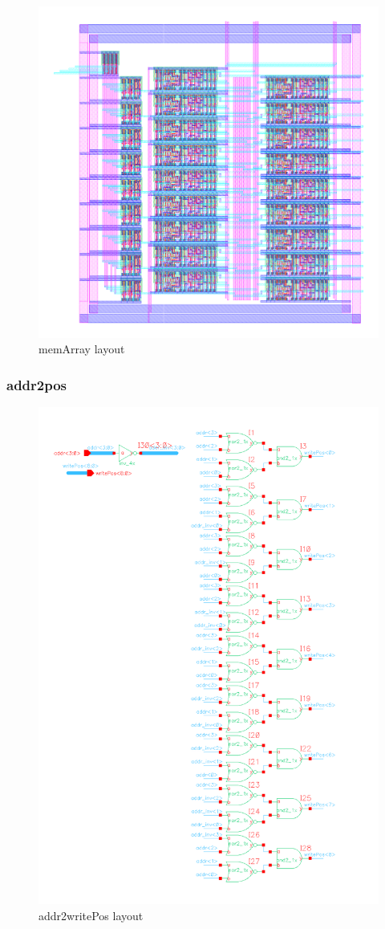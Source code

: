 \documentclass[]{article}
\begin{document}
\begin{figure}[H]
\centering
\includegraphics[width=.9\textwidth]{memArray-layout}
\caption{memArray layout}
\label{fig:memArray-layout}
\end{figure}

\subsubsection{addr2pos}
\begin{figure}[H]
\centering
\includegraphics[width=.9\textwidth]{addr2writePos-schematic}
\caption{addr2writePos layout}
\label{fig:addr2writePos-schematic}
\end{figure}
\end{document}
